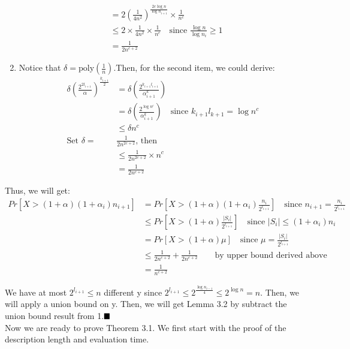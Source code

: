\documentclass[a4paper, english]{paper}
\begin{document}
\begin{enumerate}
\begin{align*}
		& = 2\left(\frac1{4n^2}\right)^{\frac{2c\log n}{\log n_{i+1}}}\times\frac1{n^c}\\
		& \le 2\times\frac1{4n^2}\times\frac1{n^c}\quad\text{since } \frac{\log n}{\log n_i} \ge 1\\
		& = \frac1{2n^{c+2}}
		\end{align*}
	\item Notice that $\delta=\text{poly}(\frac1n)$.Then, for the second item, we could derive:
		\begin{align*}
		\delta\left( \frac{2^{2l_{i+1}}}{\alpha}\right)^{\frac{k_{i+1}}2} &= \delta\left( \frac{2^{k_{i+1}l_{i+1}}}{\alpha^k_{i+1}}\right)\\
		& =  \delta\left( \frac{2^{\log n^c}}{\alpha^k_{i+1}}\right)\quad\text{since }k_{i+1}l_{k+1} = \log n^c\\
		& \le \delta n^c\\
		\text{Set }\delta = &\frac1{2n^{2c+2}}\text{, then}\\
		& \le \frac1{2n^{2c+2}}\times n^c\\
		& = \frac1{2n^{c+2}}
		\end{align*}
	\end{enumerate}\par
	Thus, we will get:
	\begin{align*}
	Pr\left[X>(1+\alpha)(1+\alpha_i)n_{i+1}\right] &= Pr\left[X>(1+\alpha)(1+\alpha_i)\frac{n_i}{2^{l_{i+1}}}\right]\quad\text{since }n_{i+1} = \frac{n_i}{2^{l_{i+1}}}\\
	& \le Pr\left[X>(1+\alpha)\frac{|S_i|}{2^{l_{i+1}}}\right]\quad\text{since }|S_i|\le(1+\alpha_i)n_i\\
	& = Pr \left[X>(1+\alpha)\mu\right]\quad\text{since }\mu = \frac{|S_i|}{2^{l_{i+1}}}\\
	& \le \frac1{2n^{c+2}}+\frac1{2n^{c+2}}\qquad \text{by upper bound derived above}\\ 
	& = \frac1{n^{c+2}}
	\end{align*}\par
	We have at most $2^{l_{i+1}}\le n$ different y since $2^{l_{i+1}}\le2^{\frac{\log n_{i-1}}4}\le 2^{\log n}=n$. Then, we will apply a union bound on y. Then, we will get Lemma 3.2 by subtract the union bound result from 1.$\hfill\blacksquare$ \\

 Now we are ready to prove Theorem 3.1. We first start with the proof of the description length and evaluation time.
	
\end{document}
